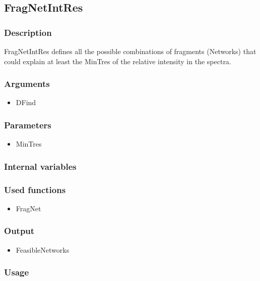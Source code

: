 \subsection{FragNetIntRes}\label{FragNetIntRes}
\subsubsection{Description}
FragNetIntRes defines all the possible combinations of fragments (Networks) that could explain at least the MinTres of the relative intensity in the spectra.
\subsubsection{Arguments}
\begin{itemize}
\item DFind
\end{itemize}
\subsubsection{Parameters}
\begin{itemize}
\item MinTres
\end{itemize}
\subsubsection{Internal variables}
\subsubsection{Used functions}
\begin{itemize}
\item FragNet
\end{itemize}
\subsubsection{Output}
\begin{itemize}
\item FeasibleNetworks
\end{itemize}
\subsubsection{Usage}




